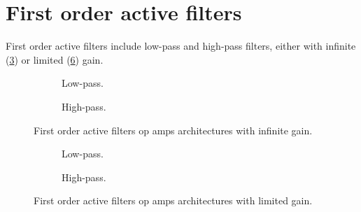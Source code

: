\section{First order active filters}

	First order active filters include low-pass and high-pass filters, either with infinite (\cref{fig__opamp__filter_1st_ord_Ginf}) or limited (\cref{fig__opamp__filter_1st_ord_Glim}) gain.


	\begin{figure}[htb]
		\centering
		\begin{subfigure}[b]{0.8\textwidth}
			\centering
			
			\caption{Low-pass.%
				\label{fig__opamp__filter_1st_ord_Ginf__low_pass}}
			\vspace*{3ex}
		\end{subfigure}
		\begin{subfigure}[b]{0.8\textwidth}
			\centering
			
			\caption{High-pass.%
				\label{fig__opamp__filter_1st_ord_Ginf__high_pass}}
		\end{subfigure}
		\caption{First order active filters op amps architectures with infinite gain.%
			\label{fig__opamp__filter_1st_ord_Ginf}}
	\end{figure}

	\begin{figure}[htb]
		\centering
		\begin{subfigure}[b]{1\textwidth}
			\centering
			
			\caption{Low-pass.%
				\label{fig__opamp__filter_1st_ord_Glim__low_pass}}
			\vspace*{3ex}
		\end{subfigure}
		\begin{subfigure}[b]{1\textwidth}
			\centering
			
			\caption{High-pass.%
				\label{fig__opamp__filter_1st_ord_Glim__high_pass}}
		\end{subfigure}
		\caption{First order active filters op amps architectures with limited gain.%
			\label{fig__opamp__filter_1st_ord_Glim}}
	\end{figure}
